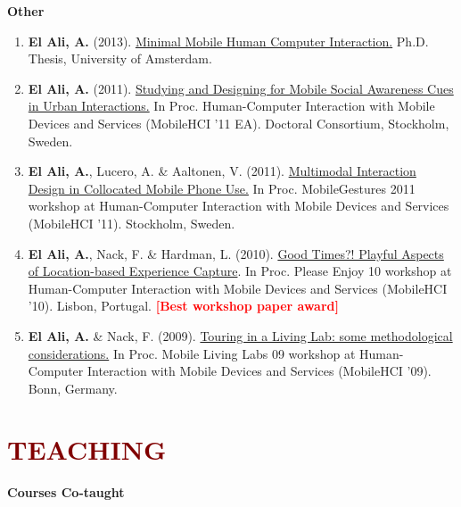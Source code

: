 \documentclass{article}
\begin{document}
\textbf{Other}

\begin{enumerate}

\item \textbf{El Ali, A.} (2013). \href{http://abdoelali.com/pdfs/phdthesis_abdallah_elali.pdf}{Minimal Mobile Human Computer Interaction.} Ph.D. Thesis, University of Amsterdam.

\item  \textbf{El Ali, A.} (2011). \href{http://abdoelali.com/pdfs/mobilehci2011_DC_elali.pdf}{Studying and Designing for Mobile Social Awareness Cues in Urban Interactions.} In Proc. Human-Computer Interaction with Mobile Devices and Services (MobileHCI '11 EA). Doctoral Consortium, Stockholm, Sweden.

\item  \textbf{El Ali, A.}, Lucero, A. \& Aaltonen, V. (2011). \href{http://www.medien.ifi.lmu.de/mobilegestures2011/Accepted_Papers_files/MobileGestures2011-Accepted-Submissions.zip}{Multimodal Interaction Design in Collocated Mobile Phone Use.} In Proc. MobileGestures 2011 workshop at Human-Computer Interaction with Mobile Devices and Services (MobileHCI '11). Stockholm, Sweden.

\item  \textbf{El Ali, A.}, Nack, F. \& Hardman, L. (2010). \href{http://abdoelali.com/pdfs/playfulnesswsali.pdf}{Good Times?! Playful Aspects of Location-based Experience Capture}. In Proc. Please Enjoy 10 workshop at Human-Computer Interaction with Mobile Devices and Services (MobileHCI '10). Lisbon, Portugal. \textbf{\textcolor{red}{[Best workshop paper award]}}

\item  \textbf{El Ali, A.} \& Nack, F. (2009). \href{http://abdoelali.com/pdfs/MLL09_Proceedings.pdf}{Touring in a Living Lab: some methodological considerations.} In Proc. Mobile Living Labs 09 workshop at Human-Computer Interaction with Mobile Devices and Services (MobileHCI '09). Bonn, Germany.

\end{enumerate}



\section*{\textcolor{maroon}{\normalsize TEACHING}} 

\textbf{Courses Co-taught}
\end{document}
